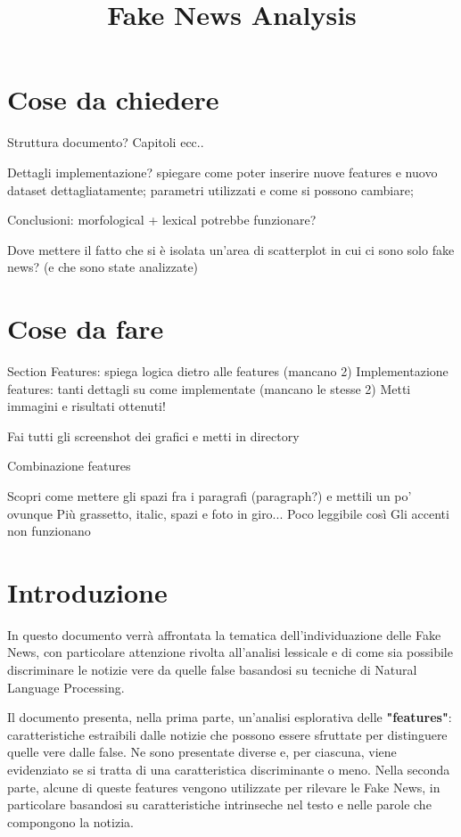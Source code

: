 \documentclass{article}
\title{Fake News Analysis}
\begin{document}
	\maketitle   
	
	\section{Cose da chiedere}
		Struttura documento? Capitoli ecc..
		
		Dettagli implementazione? spiegare come poter inserire nuove features e nuovo dataset dettagliatamente; parametri utilizzati e come si possono cambiare; 
		
		Conclusioni: morfological + lexical potrebbe funzionare? 
		
		Dove mettere il fatto che si è isolata un'area di scatterplot in cui ci sono solo fake news? (e che sono state analizzate)
		
	\section{Cose da fare}
	Section Features: spiega logica dietro alle features (mancano 2)
	Implementazione features: tanti dettagli su come implementate (mancano le stesse 2)
	Metti immagini e risultati ottenuti! 
	
	Fai tutti gli screenshot dei grafici e metti in directory
	
	Combinazione features
	
		Scopri come mettere gli spazi fra i paragrafi (paragraph?) e mettili un po' ovunque
		Più grassetto, italic, spazi e foto in giro... Poco leggibile così
		Gli accenti non funzionano
	
	 
    \newpage
    	
   	\section{Introduzione}
    	In questo documento verrà affrontata la tematica dell'individuazione delle Fake News, con particolare attenzione rivolta all'analisi lessicale e di come sia possibile discriminare le notizie vere da quelle false basandosi su tecniche di Natural Language Processing.
	    	
	    Il documento presenta, nella prima parte, un'analisi esplorativa delle \textbf{"features"}: caratteristiche estraibili dalle notizie che possono essere sfruttate per distinguere quelle vere dalle false. Ne sono presentate diverse e, per ciascuna, viene evidenziato se si tratta di una caratteristica discriminante o meno.
	    Nella seconda parte, alcune di queste features vengono utilizzate per rilevare le Fake News, in particolare basandosi su caratteristiche intrinseche nel testo e nelle parole che compongono la notizia.
	    	
\end{document}
